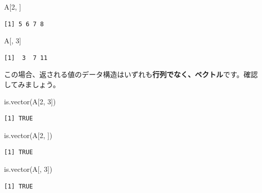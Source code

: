 \documentclass[
  a4paper,
  pandoc,
  ja=standard,
  jafont=haranoaji]{bxjsbook}
\newenvironment{Shaded}{\begin{snugshade}}{\end{snugshade}}
\newcommand{\DecValTok}[1]{\textcolor[rgb]{0.68,0.00,0.00}{#1}}
\newcommand{\FunctionTok}[1]{\textcolor[rgb]{0.28,0.35,0.67}{#1}}
\newcommand{\NormalTok}[1]{\textcolor[rgb]{0.00,0.48,0.65}{#1}}
\begin{document}
\begin{Shaded}
\begin{Highlighting}[numbers=left,,]
\NormalTok{A[}\DecValTok{2}\NormalTok{, ]}
\end{Highlighting}
\end{Shaded}

\begin{verbatim}
[1] 5 6 7 8
\end{verbatim}

\begin{Shaded}
\begin{Highlighting}[numbers=left,,]
\NormalTok{A[, }\DecValTok{3}\NormalTok{]}
\end{Highlighting}
\end{Shaded}

\begin{verbatim}
[1]  3  7 11
\end{verbatim}

この場合、返される値のデータ構造はいずれも\textbf{行列でなく、ベクトル}です。確認してみましょう。

\begin{Shaded}
\begin{Highlighting}[numbers=left,,]
\FunctionTok{is.vector}\NormalTok{(A[}\DecValTok{2}\NormalTok{, }\DecValTok{3}\NormalTok{])}
\end{Highlighting}
\end{Shaded}

\begin{verbatim}
[1] TRUE
\end{verbatim}

\begin{Shaded}
\begin{Highlighting}[numbers=left,,]
\FunctionTok{is.vector}\NormalTok{(A[}\DecValTok{2}\NormalTok{, ])}
\end{Highlighting}
\end{Shaded}

\begin{verbatim}
[1] TRUE
\end{verbatim}

\begin{Shaded}
\begin{Highlighting}[numbers=left,,]
\FunctionTok{is.vector}\NormalTok{(A[, }\DecValTok{3}\NormalTok{])}
\end{Highlighting}
\end{Shaded}

\begin{verbatim}
[1] TRUE
\end{verbatim}
\end{document}
